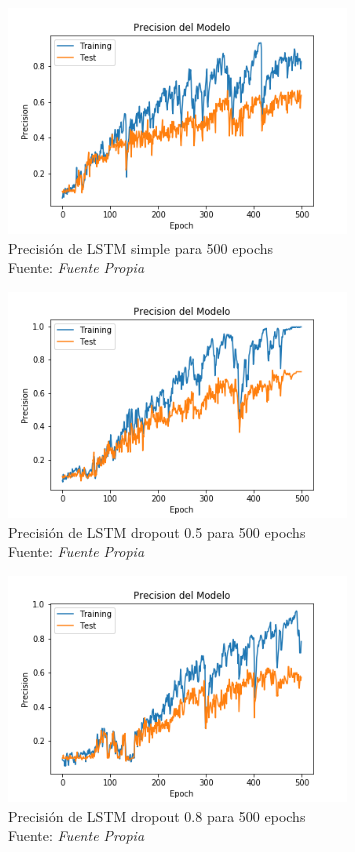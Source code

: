 \begin{figure}[H]
	\centering
	\includegraphics[width=0.8\textwidth]{Figures/LSTMsimpleprec}
	\caption{Precisión de LSTM simple para 500 epochs\\ Fuente: {\textit{Fuente Propia}}}
	\label{LSTMsimpel}
\end{figure} 

\begin{figure}[H]
	\centering
	\includegraphics[width=0.8\textwidth]{Figures/LSTM_droprec05.png}
	\caption{Precisión de LSTM dropout 0.5 para 500 epochs\\ Fuente: {\textit{Fuente Propia}}}
	\label{LSTMdropout5}
\end{figure} 



\begin{figure}[H]
	\centering
	\includegraphics[width=0.8\textwidth]{Figures/lstm_drop08prec.png}
	\caption{Precisión de LSTM dropout 0.8 para 500 epochs\\ Fuente: {\textit{Fuente Propia}}}
	\label{LSTMdropout8}
\end{figure} 
